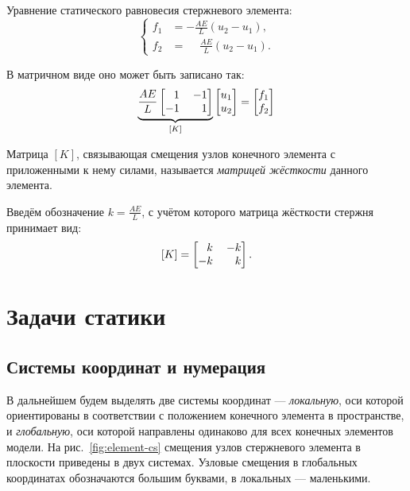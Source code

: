 \documentclass[10pt]{article}
\numberwithin{equation}{section}
\newcommand{\neword}{\emph}
\newcommand{\matr}[1]{[#1]}
\newcommand{\figref}[1]{рис. \ref{#1}}
\newcommand{\mm}{\llap{$-$}}
\newcommand{\phm}{\phantom{-}}
\begin{document}
Уравнение статического равновесия стержневого элемента:
\begin{equation}
  \begin{cases}
    f_1 &= -\frac{AE}{L}(u_2-u_1),\\
    f_2 &= \phm\frac{AE}{L}(u_2-u_1).
  \end{cases}
\end{equation}

В матричном виде оно может быть записано так:
\begin{equation}
  \label{eq:bar-equil}
  \underbrace{
  \frac{AE}{L}
  \begin{bmatrix}
    \phm{}1 && \mm1\\
    -1 && 1
  \end{bmatrix}}_{\matr{K}}
  \begin{bmatrix}
    u_1\\
    u_2
  \end{bmatrix}
  =
  \begin{bmatrix}
    f_1\\
    f_2
  \end{bmatrix}
\end{equation}

Матрица $\matr{K}$, связывающая смещения узлов конечного элемента с
приложенными к нему силами, называется \neword{матрицей жёсткости}
данного элемента. 

Введём обозначение $k = \frac{AE}{L}$, с учётом которого матрица
жёсткости стержня принимает вид:
\begin{equation}
  \label{eq:bar-stiffness}
  \matr{K} =
  \begin{bmatrix}
    \phm{}k&& \mm k\\
    -k && k
  \end{bmatrix}.
\end{equation}

\clearpage
\section{Задачи статики}

\subsection{Системы координат и нумерация}
\label{sec:notation}

В дальнейшем будем выделять две системы координат —
\neword{локальную}, оси которой ориентированы в соответствии с
положением конечного элемента в пространстве, и \neword{глобальную},
оси которой направлены одинаково для всех конечных элементов модели.
На \figref{fig:element-cs} смещения узлов стержневого элемента в
плоскости приведены в двух системах. Узловые смещения в глобальных
координатах обозначаются большим буквами, в локальных — маленькими.
\end{document}
